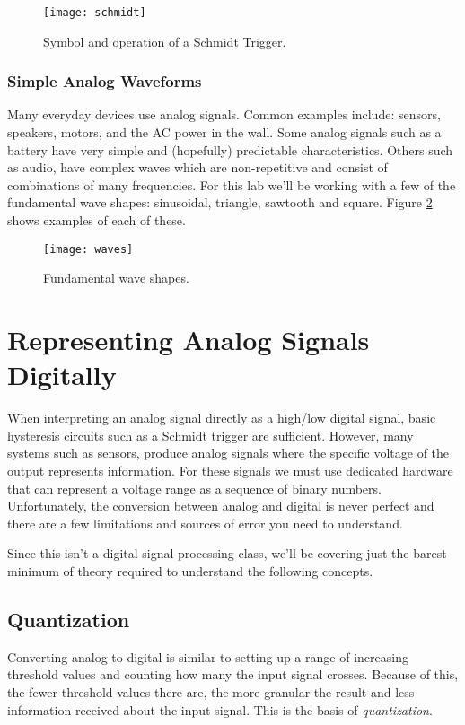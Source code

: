 \documentclass[11pt,fleqn]{book} %
\begin{document}
\begin{figure}[]
    \centering\texttt{[image: schmidt]}
    \caption{Symbol and operation of a Schmidt Trigger.}
    \label{schmidt}
\end{figure}

\subsubsection{Simple Analog Waveforms}
Many everyday devices use analog signals. Common examples include: sensors, speakers, motors, and the AC power in the wall. Some analog signals such as a battery have very simple and (hopefully) predictable characteristics. Others such as audio, have complex waves which are non-repetitive and consist of combinations of many frequencies. For this lab we'll be working with a few of the fundamental wave shapes: sinusoidal, triangle, sawtooth and square. Figure \ref{waves} shows examples of each of these. 

\begin{figure}[]
    \centering\texttt{[image: waves]}
    \caption{Fundamental wave shapes.}
    \label{waves}
\end{figure}


\section{Representing Analog Signals Digitally}
When interpreting an analog signal directly as a high/low digital signal, basic hysteresis circuits such as a Schmidt trigger are sufficient. However, many systems such as sensors, produce analog signals where the specific voltage of the output represents information. For these signals we must use dedicated hardware that can represent a voltage range as a sequence of binary numbers. Unfortunately, the conversion between analog and digital is never perfect and there are a few limitations and sources of error you need to understand. 

Since this isn't a digital signal processing class, we'll be covering just the barest minimum of theory required to understand the following concepts.

\subsection{Quantization}
Converting analog to digital is similar to setting up a range of increasing threshold values and counting how many the input signal crosses. Because of this, the fewer threshold values there are, the more granular the result and less information received about the input signal. This is the basis of \textit{quantization}.
\end{document}
